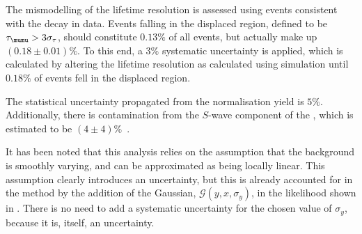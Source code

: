 %


The mismodelling of the lifetime resolution is assessed using events consistent with the decay
\btojpsikstr in data.
Events falling in the displaced region, defined to be $\tau_{\mumu} > 3\sigma_\tau$, should
constitute $0.13\%$ of all events, but actually make up $(0.18\pm0.01)\%$.
To this end, a $3\%$ systematic uncertainty is applied, which is calculated by altering the
lifetime resolution as calculated using simulation until $0.18\%$ of events fell in the displaced
region.

The statistical uncertainty propagated from the normalisation yield is $5\%$.
Additionally, there is contamination from the $S$-wave component of the \Kstarz, which is
estimated to be $(4\pm4)\%$~\cite{LHCb-PAPER-2013-019}.

It has been noted that this analysis relies on the assumption that the background is smoothly
varying, and can be approximated as being locally linear.
This assumption clearly introduces an uncertainty, but this is already accounted for in the method
by the addition of the Gaussian, $\mathcal{G}(y, x, \sigma_y)$, in the likelihood shown in
.
There is no need to add a systematic uncertainty for the chosen value of $\sigma_y$, because it is,
itself, an uncertainty.













